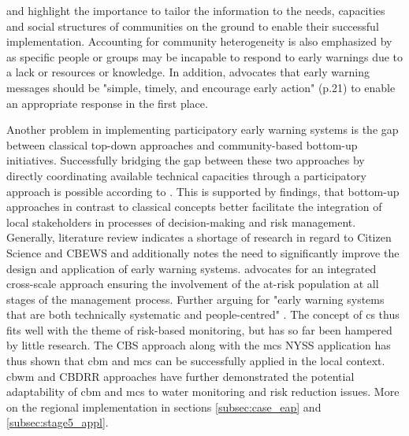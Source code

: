 \Textcite{gladfelterPoliticsParticipationCommunitybased2018,inayathEarlyWarningSystem2018} and \textcite{trogrlicIndigenousKnowledgeEarly2018} highlight the importance to tailor the information to the needs, capacities and social structures of communities on the ground to enable their successful implementation. Accounting for community heterogeneity is also emphasized by \textcite{gladfelterPoliticsParticipationCommunitybased2018} as specific people or groups may be incapable to respond to early warnings due to a lack or resources or knowledge. In addition, \autocite{inayathEarlyWarningSystem2018} advocates that early warning messages should be "simple, timely, and encourage early action" (p.21) to enable an appropriate response in the first place.

Another problem in implementing participatory early warning systems is the gap between classical top-down approaches and community-based bottom-up initiatives. Successfully bridging the gap between these two approaches by directly coordinating available technical capacities through a participatory approach is possible according to \textcite{tarchianiCommunityImpactBased2020}. This is supported by \textcite{henriksenParticipatoryEarlyWarning2018} findings, that bottom-up approaches in contrast to classical concepts better facilitate the integration of local stakeholders in processes of decision-making and risk management. Generally, \textcite{marcheziniReviewStudiesParticipatory2018} literature review indicates a shortage of research in regard to Citizen Science and CBEWS and \textcite{baudoinEarlyWarningSystems2014} additionally notes the need to significantly improve the design and application of early warning systems. \Textcite{baudoinEarlyWarningSystems2014} advocates for an integrated cross-scale approach ensuring the involvement of the at-risk population at all stages of the management process. Further arguing for "early warning systems that are both technically systematic and people-centred" \autocite[15]{baudoinEarlyWarningSystems2014}. The concept of \acrshort{cs} thus fits well with the theme of risk-based monitoring, but has so far been hampered by little research.\newline
The CBS approach along with the \acrshort{mcs} NYSS application has thus shown that \acrshort{cbm} and \acrshort{mcs} can be successfully applied in the local context. \acrshort{cbwm} and CBDRR approaches have further demonstrated the potential adaptability of \acrshort{cbm} and \acrshort{mcs} to water monitoring and risk reduction issues. More on the regional implementation in sections \ref{subsec:case_eap} and \ref{subsec:stage5_appl}.


